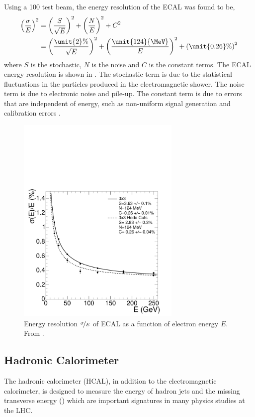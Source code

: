 Using a \unit{100}{\GeV} test beam, the energy resolution of the {ECAL} was
found to be\cite{chatrchyan2008cms},
\begin{align}
\left(\frac{\sigma}{E}\right)^{2} 
&= \left(\frac{S}{\sqrt{E}}\right)^{2} + \left(\frac{N}{E}\right)^{2} + C^{2}\\
&=
\left(\frac{\unit{2}{\%}}{\sqrt{E}}\right)^{2} +
\left(\frac{\unit{124}{\MeV}}{E}\right)^{2} + 
\left(\unit{0.26}{\%}\right)^{2}  
\end{align}
where $S$ is the stochastic, $N$ is the noise and $C$ is the constant terms.
The {ECAL} energy resolution is shown in .  The
stochastic term is due to the statistical fluctuations in the particles produced
in the electromagnetic shower. The noise term is due to electronic noise and
pile-up. The constant term is due to errors that are independent of energy, such
as non-uniform signal generation and calibration errors \cite{chatrchyan2008cms}.

\begin{figure}[htbp]
  \centering
  \includegraphics[width=0.7\textwidth]{ecal_performance}
  \caption{Energy resolution $\nicefrac{\sigma}{E}$ of ECAL as a function of
\label{fig:ECAL} electron energy $E$. From \cite{chatrchyan2008cms}.}
\end{figure}

\subsection{Hadronic Calorimeter}
The hadronic calorimeter (HCAL), in addition to the electromagnetic calorimeter,
is designed to measure the energy of hadron jets and the missing transverse
energy (\met) which are important signatures in many physics studies at the LHC.

